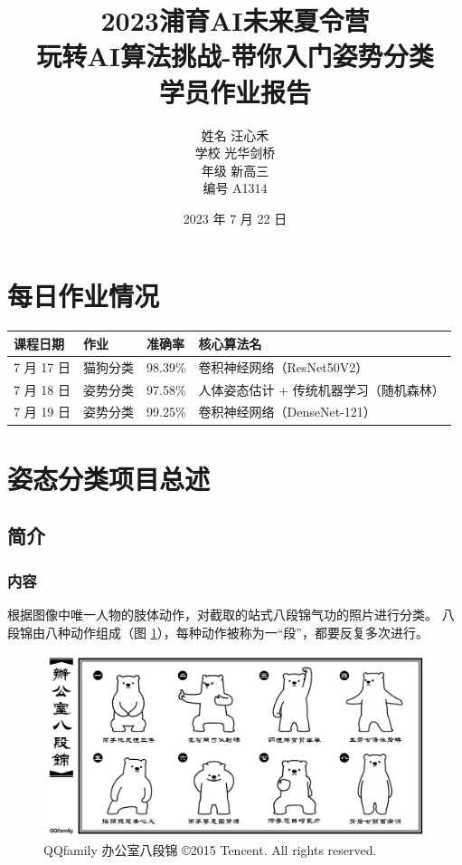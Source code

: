 \documentclass[12pt,titlepage]{article}
\title{\textbf{
2023浦育AI未来夏令营\\
玩转AI算法挑战-带你入门姿势分类\\
学员作业报告
}}
\author{
{\descriptionlabel 姓名} 汪心禾\\
{\descriptionlabel 学校} 光华剑桥\\
{\descriptionlabel 年级} 新高三\\
{\descriptionlabel 编号} A1314
}
\date{2023 年 7 月 22 日}
\begin{document}
\maketitle

\section{每日作业情况}
\begin{tabular}{|l|l|l|l|}
  \hline
  课程日期     & 作业   & 准确率     & 核心算法名                 \\
  \hline
  7 月 17 日 & 猫狗分类 & 98.39\% & 卷积神经网络（ResNet50V2）    \\
  \hline
  7 月 18 日 & 姿势分类 & 97.58\% & 人体姿态估计 + 传统机器学习（随机森林） \\
  \hline
  7 月 19 日 & 姿势分类 & 99.25\% & 卷积神经网络（DenseNet-121）  \\
  \hline
\end{tabular}

\section{姿态分类项目总述}

\subsection{简介}

\subsubsection{内容}

根据图像中唯一人物的肢体动作，对截取的站式八段锦气功的照片进行分类。
八段锦由八种动作组成（图 \ref{fig:baduanjin}），每种动作被称为一“段”，都要反复多次进行。

\begin{figure}[h!]
  \centering
  \includegraphics[width=.8\textwidth]{./6ca00034141855.56c56f80ea17f.png}
  \caption{
    QQfamily 办公室八段锦
    \copyright 2015 Tencent. All rights reserved.\cite{QQfamily}
  }
  \label{fig:baduanjin}
\end{figure}
\end{document}

